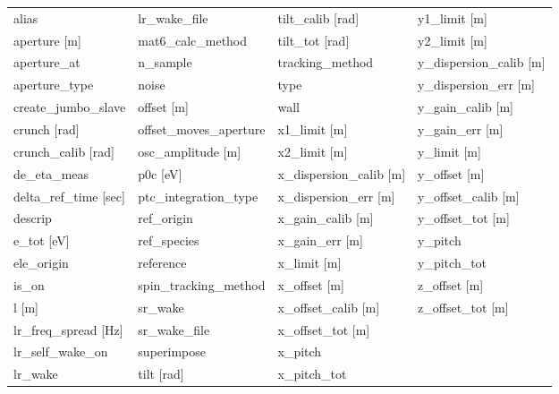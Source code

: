  \begin{tabular}{llll} \toprule
alias                            & lr_wake_file                     & tilt_calib [rad]                 & y1_limit [m]                     \\
aperture [m]                     & mat6_calc_method                 & tilt_tot [rad]                   & y2_limit [m]                     \\
aperture_at                      & n_sample                         & tracking_method                  & y_dispersion_calib [m]           \\
aperture_type                    & noise                            & type                             & y_dispersion_err [m]             \\
create_jumbo_slave               & offset [m]                       & wall                             & y_gain_calib [m]                 \\
crunch [rad]                     & offset_moves_aperture            & x1_limit [m]                     & y_gain_err [m]                   \\
crunch_calib [rad]               & osc_amplitude [m]                & x2_limit [m]                     & y_limit [m]                      \\
de_eta_meas                      & p0c [eV]                         & x_dispersion_calib [m]           & y_offset [m]                     \\
delta_ref_time [sec]             & ptc_integration_type             & x_dispersion_err [m]             & y_offset_calib [m]               \\
descrip                          & ref_origin                       & x_gain_calib [m]                 & y_offset_tot [m]                 \\
e_tot [eV]                       & ref_species                      & x_gain_err [m]                   & y_pitch                          \\
ele_origin                       & reference                        & x_limit [m]                      & y_pitch_tot                      \\
is_on                            & spin_tracking_method             & x_offset [m]                     & z_offset [m]                     \\
l [m]                            & sr_wake                          & x_offset_calib [m]               & z_offset_tot [m]                 \\
lr_freq_spread [Hz]              & sr_wake_file                     & x_offset_tot [m]                 &                                  \\
lr_self_wake_on                  & superimpose                      & x_pitch                          &                                  \\
lr_wake                          & tilt [rad]                       & x_pitch_tot                      &                                  \\
 \bottomrule
 \end{tabular}
 \vfill
 
